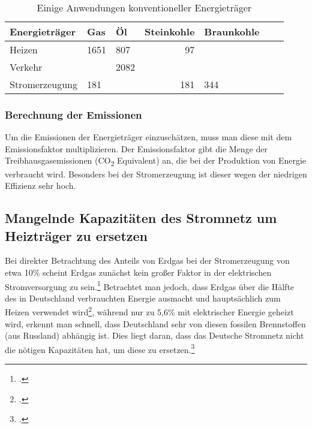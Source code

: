 \documentclass[12pt]{article}
\begin{document}
    \begin{table}[!h]
        \centering
        \begin{tabular}{lllrlll}
            \toprule
            \textbf{Energieträger} & \textbf{Gas} & \textbf{Öl} & \textbf{Steinkohle} & \textbf{Braunkohle} \\
            \midrule
            Heizen                 & 1651         & 807         & 97                  &                     \\
            Verkehr                &              & 2082        &                     &                     \\
            Stromerzeugung         & 181          &             & 181                 & 344                 \\
            \bottomrule
        \end{tabular}
        \caption{Einige Anwendungen konventioneller Energieträger}
        \label{tab:}
    \end{table}

    \subsubsection{Berechnung der Emissionen}

    Um die Emissionen der Energieträger einzuschätzen, muss man diese mit dem Emissionsfaktor multiplizieren.
    Der Emissionsfaktor gibt die Menge der Treibhausgasemissionen (CO\textsubscript{2} Equivalent) an,
    die bei der Produktion von Energie verbraucht wird.
    Besonders bei der Stromerzeugung ist dieser wegen der niedrigen Effizienz sehr hoch.


    \subsection{Mangelnde Kapazitäten des Stromnetz um Heizträger zu ersetzen}
    Bei direkter Betrachtung des Anteils von Erdgas bei der Stromerzeugung von etwa 10\% scheint Erdgas zunächst
    kein großer Faktor in der elektrischen Stromversorgung zu sein.\footcite{SMARDHoherEEAnteil, EnergieWofurErdgas}
    Betrachtet man jedoch, dass Erdgas über die Hälfte des in Deutschland verbrauchten
    Energie ausmacht und hauptsächlich zum Heizen verwendet wird\footcite{Anwendungsbereiche, EnergieWofurErdgas},
    während nur zu 5,6\% mit elektrischer Energie geheizt wird, erkennt man schnell, dass Deutschland sehr von diesen
    fossilen Brennstoffen (aus Russland) abhängig ist.
    Dies liegt daran, dass das Deutsche Stromnetz nicht die nötigen Kapazitäten hat, um diese zu
    ersetzen.\footcite{EnergieWofurErdgas}
\end{document}
